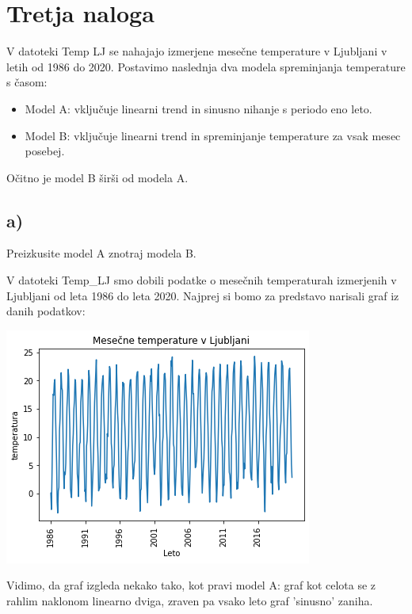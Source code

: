 \documentclass[12pt, a4paper]{article}
\begin{document}
\section*{Tretja naloga}

V datoteki Temp LJ se nahajajo izmerjene mesečne temperature v Ljubljani v 
letih od 1986 do 2020. Postavimo naslednja dva modela spreminjanja temperature
s časom: 

\begin{itemize}
     
    \item Model A: vključuje linearni trend in sinusno nihanje s periodo eno 
        leto.
    \item Model B: vključuje linearni trend in spreminjanje temperature za 
        vsak mesec posebej.

\end{itemize}

Očitno je model B širši od modela A.

\subsection*{a)}

Preizkusite model A znotraj modela B.

V datoteki Temp\_LJ smo dobili podatke o mesečnih temperaturah izmerjenih
v Ljubljani od leta 1986 do leta 2020. Najprej si bomo za predstavo narisali 
graf iz danih podatkov:

\begin{center}
    \includegraphics[scale=0.7]{Naloga_3_01}
\end{center}

Vidimo, da graf izgleda nekako tako, kot pravi model A: graf kot celota se z
rahlim naklonom linearno dviga, zraven pa vsako leto graf 'sinusno' zaniha.
\end{document}
